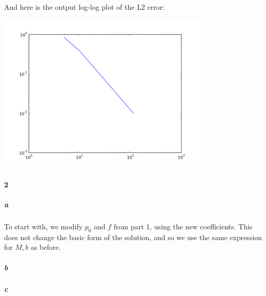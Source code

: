 \documentclass{article}
\begin{document}
And here is the output log-log plot of the L2 error:

\begin{center}
\includegraphics[width=4in]{prob1_err.png}
\end{center}

\paragraph{2}

\subparagraph{a}

To start with, we modify $p_0$ and $f$ from part 1, using the new coefficients.  This does not change the basic form of the solution, and so we use the same expression for $M, b$ as before.



\subparagraph{b}

\subparagraph{c}
\end{document}
